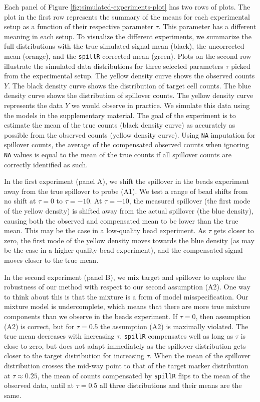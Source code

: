 \documentclass{bioinfo}
\begin{document}
Each panel of Figure \ref{fig:simulated-experiments-plot} has two rows
of plots. The plot in the first row represents the summary of the means
for each experimental setup as a function of their respective parameter
\(\tau\). This parameter has a different meaning in each setup. To
visualize the different experiments, we summarize the full distributions
with the true simulated signal mean (black), the uncorrected mean
(orange), and the \texttt{spillR} corrected mean (green). Plots on the
second row illustrate the simulated data distributions for three
selected parameters \(\tau\) picked from the experimental setup. The
yellow density curve shows the observed counts \(Y\). The black density
curve shows the distribution of target cell counts. The blue density
curve shows the distribution of spillover counts. The yellow density
curve represents the data \(Y\) we would observe in practice. We
simulate this data using the models in the supplementary material. The
goal of the experiment is to estimate the mean of the true counts (black
density curve) as accurately as possible from the observed counts
(yellow density curve). Using \texttt{NA} imputation for spillover
counts, the average of the compensated observed counts when ignoring
\texttt{NA} values is equal to the mean of the true counts if all
spillover counts are correctly identified as such.

In the first experiment (panel A), we shift the spillover in the beads
experiment away from the true spillover to probe (A1). We test a range
of bead shifts from no shift at \(\tau = 0\) to \(\tau = -10\). At
\(\tau = -10\), the measured spillover (the first mode of the yellow
density) is shifted away from the actual spillover (the blue density),
causing both the observed and compensated mean to be lower than the true
mean. This may be the case in a low-quality bead experiment. As \(\tau\)
gets closer to zero, the first mode of the yellow density moves towards
the blue density (as may be the case in a higher quality bead
experiment), and the compensated signal moves closer to the true mean.

In the second experiment (panel B), we mix target and spillover to
explore the robustness of our method with respect to our second
assumption (A2). One way to think about this is that the mixture is a
form of model misspecification. Our mixture model is undercomplete,
which means that there are more true mixture components than we observe
in the beads experiment. If \(\tau = 0\), then assumption (A2) is
correct, but for \(\tau = 0.5\) the assumption (A2) is maximally
violated. The true mean decreases with increasing \(\tau\).
\texttt{spillR} compensates well as long as \(\tau\) is close to zero,
but does not adapt immediately as the spillover distribution gets closer
to the target distribution for increasing \(\tau\). When the mean of the
spillover distribution crosses the mid-way point to that of the target
marker distribution at \(\tau \approx 0.25\), the mean of counts
compensated by \texttt{spillR} flips to the mean of the observed data,
until at \(\tau = 0.5\) all three distributions and their means are the
same.
\end{document}
